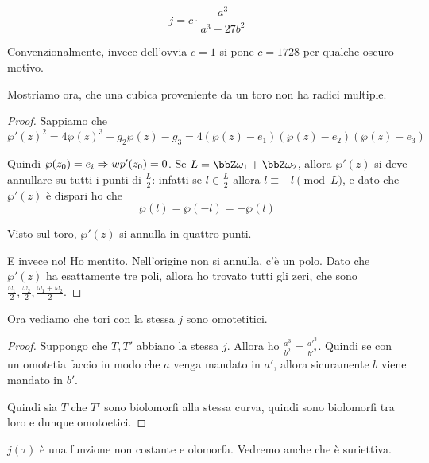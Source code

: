 	\[
		j = c \cdot \frac {a^3}{a^3-27b^2}
	\]

	Convenzionalmente, invece dell'ovvia $c=1$ si pone $c=1728$ per qualche oscuro motivo.
	
	Mostriamo ora, che una cubica proveniente da un toro non ha radici multiple.
	
	\begin{proof}
		Sappiamo che 
		\[
			\wp'(z)^2=4\wp(z)^3-g_2\wp(z)-g_3 = 4(\wp(z)-e_1)(\wp(z)-e_2)(\wp(z)-e_3)
		\]
		
		Quindi $\wp(z_0)=e_i \Rightarrow wp'(z_0)=0$.
		Se $L=\bbZ\omega_1 + \bbZ\omega_2$, allora $\wp'(z)$ si deve annullare su tutti i punti di $\frac L2$: infatti se $l \in \frac L2$ allora $l \equiv -l \pmod L$, e dato che $\wp'(z)$ è dispari ho che 
		\[
			\wp(l) = \wp(-l) = -\wp(l)
		\]
		
		Visto sul toro, $\wp'(z)$ si annulla in quattro punti.
		
		E invece no! Ho mentito. Nell'origine non si annulla, c'è un polo. Dato che $\wp'(z)$ ha esattamente tre poli, allora ho trovato tutti gli zeri, che sono $\frac{\omega_1}2, \frac{\omega_2}2, \frac{\omega_1+\omega_2}2$.
		

	\end{proof}

	Ora vediamo che tori con la stessa $j$ sono omotetitici.
	
	\begin{proof}
		Suppongo che $T, T'$ abbiano la stessa $j$. Allora ho $\frac{a^3}{b^2}=\frac{a'^3}{b'^2}$. Quindi se con un omotetia faccio in modo che $a$ venga mandato in $a'$, allora sicuramente $b$ viene mandato in $b'$. %
		
		Quindi sia $T$ che $T'$ sono biolomorfi alla stessa curva, quindi sono biolomorfi tra loro e dunque omotoetici.
	\end{proof}
	
	\begin{osservazione}
		$j(\tau)$ è una funzione non costante e olomorfa. Vedremo anche che è suriettiva.
	\end{osservazione}


	
	


